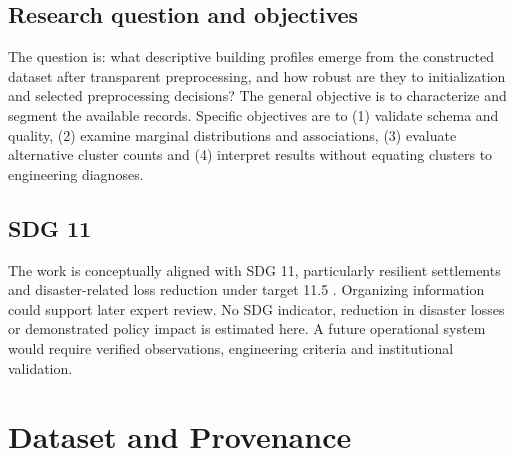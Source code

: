 \documentclass[conference]{IEEEtran}
\begin{document}
\subsection{Research question and objectives}
The question is: what descriptive building profiles emerge from the constructed dataset after transparent preprocessing, and how robust are they to initialization and selected preprocessing decisions?
The general objective is to characterize and segment the available records. Specific objectives are to (1) validate schema and quality, (2) examine marginal distributions and associations, (3) evaluate alternative cluster counts and (4) interpret results without equating clusters to engineering diagnoses.
\subsection{SDG 11}
The work is conceptually aligned with SDG 11, particularly resilient settlements and disaster-related loss reduction under target 11.5 \cite{un}. Organizing information could support later expert review. No SDG indicator, reduction in disaster losses or demonstrated policy impact is estimated here. A future operational system would require verified observations, engineering criteria and institutional validation.

\section{Dataset and Provenance}
\end{document}
